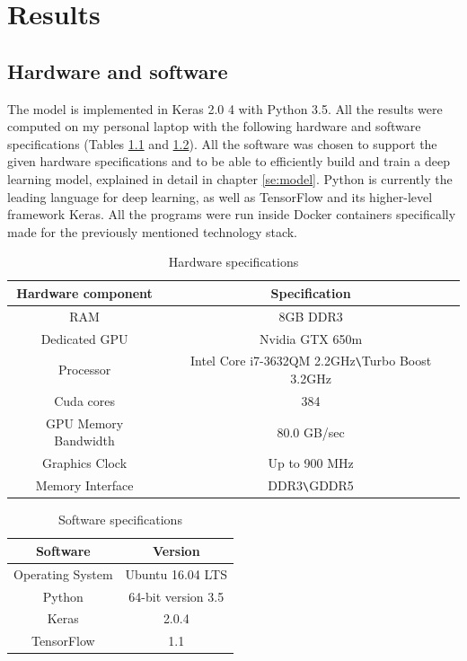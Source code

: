 \documentclass[times, utf8, diplomski]{fer}
\begin{document}
\chapter{Results}
\label{se:results}

\section{Hardware and software}
The model is implemented in Keras 2.0 4 with Python 3.5. All the results were computed on my personal laptop with the following hardware and software specifications (Tables \ref{tb:hardware_specifications} and \ref{tb:software_specifications}). All the software was chosen to support the given hardware specifications and to be able to efficiently build and train a deep learning model, explained in detail in chapter \ref{se:model}. Python is currently the leading language for deep learning, as well as TensorFlow and its higher-level framework Keras. All the programs were run inside Docker \citep{docker} containers specifically made for the previously mentioned technology stack.

\begin{table}
\centering
\caption{Hardware specifications}
\label{tb:hardware_specifications}
\begin{tabular}{cc}
\hline 
Hardware component & Specification \\ \hline 
RAM & 8GB DDR3 \\ 
Dedicated GPU & Nvidia GTX 650m \\ 
Processor & Intel Core i7-3632QM 2.2GHz\texttt{\textbackslash}Turbo Boost 3.2GHz\\
Cuda cores & 384 \\
GPU Memory Bandwidth & 80.0 GB/sec\\
Graphics Clock & Up to 900 MHz \\
Memory Interface & DDR3\texttt{\textbackslash}GDDR5 \\
\hline 
\end{tabular} 
\end{table}

\begin{table}
\centering
\caption{Software specifications}
\label{tb:software_specifications}
\begin{tabular}{cc}
\hline 
Software & Version \\ \hline 
Operating System & Ubuntu 16.04 LTS \\ 
Python & 64-bit version 3.5 \\ 
Keras & 2.0.4 \\
TensorFlow & 1.1 \\
\hline 
\end{tabular} 
\end{table}
\end{document}
